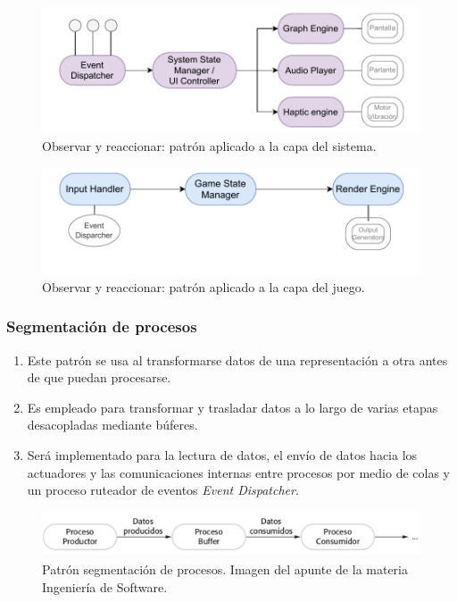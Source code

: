\documentclass[11pt,a4paper]{article}
\begin{document}
\begin{figure}[htb]
\centering 
\includegraphics[width=.75\textwidth]{../Figuras/obsReac_sys.pdf}
\caption{Observar y reaccionar: patrón aplicado a la capa del sistema.}
\label{fig:obReaSYS}
\end{figure}

\begin{figure}[htb]
\centering 
\includegraphics[width=.75\textwidth]{../Figuras/obsReac_Juego.pdf}
\caption{Observar y reaccionar: patrón aplicado a la capa del juego.}
\label{fig:obReaGAME}
\end{figure}

\subsubsection{Segmentación de procesos}
\begin{enumerate}
    \item Este patrón se usa al transformarse datos de una representación a otra antes de que puedan procesarse.
    \item Es empleado para transformar y trasladar datos a lo largo de varias etapas desacopladas mediante búferes.
    \item Será implementado para la lectura de datos, el envío de datos hacia los actuadores y las comunicaciones internas entre procesos por medio de colas y un proceso ruteador de eventos \textit{Event Dispatcher}.
\end{enumerate}

\begin{figure}[hp]
\centering 
\includegraphics[width=.85\textwidth]{../Figuras/segmentacionProcesos.png}
\caption{Patrón segmentación de procesos. Imagen del apunte de la materia Ingeniería de Software.}
\label{fig:segProces}
\end{figure}
\end{document}
